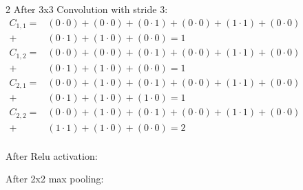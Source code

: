 \begin{multicols}{2}
After 3x3 Convolution with stride 3:\\[0.5em]
$\begin{aligned}
   C_{1,1} =
   &(0 \cdot 0) + (0 \cdot 0) + (0 \cdot 1) + 
   (0 \cdot 0) + (1 \cdot 1) + (0 \cdot 0) \\ +
   &(0 \cdot 1) + (1 \cdot 0) + (0 \cdot 0) = 1 \\[0.5em]
   C_{1,2} =
   &(0 \cdot 0) + (0 \cdot 0) + (0 \cdot 1) + 
   (0 \cdot 0) + (1 \cdot 1) + (0 \cdot 0) \\ +
   &(0 \cdot 1) + (1 \cdot 0) + (0 \cdot 0) = 1 \\[0.5em]
   C_{2,1} =
   &(0 \cdot 0) + (1 \cdot 0) + (0 \cdot 1) + 
   (0 \cdot 0) + (1 \cdot 1) + (0 \cdot 0) \\ +
   &(0 \cdot 1) + (1 \cdot 0) + (1 \cdot 0) = 1 \\[0.5em]
   C_{2,2} =
   &(0 \cdot 0) + (1 \cdot 0) + (0 \cdot 1) + 
   (0 \cdot 0) + (1 \cdot 1) + (0 \cdot 0) \\ +
   &(1 \cdot 1) + (1 \cdot 0) + (0 \cdot 0) = 2 \\[0.5em]
\end{aligned}$


After Relu activation:


After 2x2 max pooling:

\end{multicols}